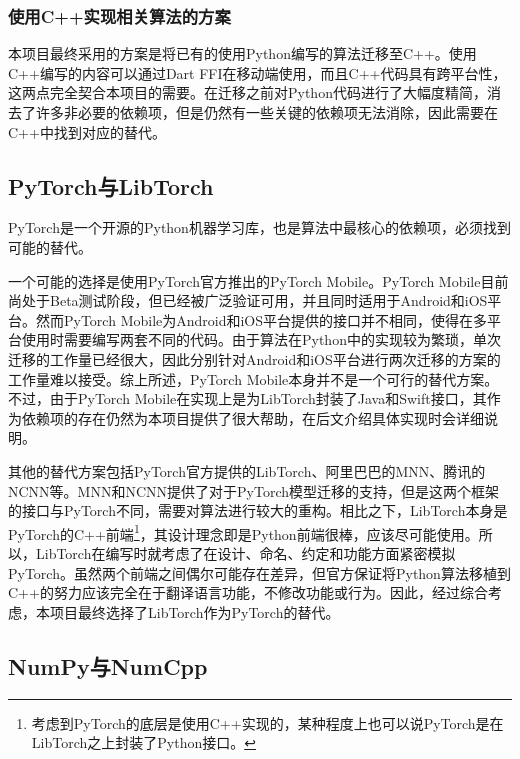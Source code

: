 \subsubsection{使用C++实现相关算法的方案}\label{subsubsec:python-cpp}

本项目最终采用的方案是将已有的使用Python编写的算法迁移至C++。使用C++编写的内容可以通过Dart FFI在移动端使用，而且C++代码具有跨平台性，这两点完全契合本项目的需要。在迁移之前对Python代码进行了大幅度精简，消去了许多非必要的依赖项，但是仍然有一些关键的依赖项无法消除，因此需要在C++中找到对应的替代。

\subsection{PyTorch与LibTorch}\label{subsec:pytorch-libtorch}

PyTorch\cite{paszkePyTorchImperativeStyle2019}是一个开源的Python机器学习库，也是算法中最核心的依赖项，必须找到可能的替代。

一个可能的选择是使用PyTorch官方推出的PyTorch Mobile。PyTorch Mobile目前尚处于Beta测试阶段，但已经被广泛验证可用，并且同时适用于Android和iOS平台。然而PyTorch Mobile为Android和iOS平台提供的接口并不相同，使得在多平台使用时需要编写两套不同的代码。由于算法在Python中的实现较为繁琐，单次迁移的工作量已经很大，因此分别针对Android和iOS平台进行两次迁移的方案的工作量难以接受。综上所述，PyTorch Mobile本身并不是一个可行的替代方案。不过，由于PyTorch Mobile在实现上是为LibTorch封装了Java和Swift接口，其作为依赖项的存在仍然为本项目提供了很大帮助，在后文介绍具体实现时会详细说明。

其他的替代方案包括PyTorch官方提供的LibTorch、阿里巴巴的MNN、腾讯的NCNN等。MNN和NCNN提供了对于PyTorch模型迁移的支持，但是这两个框架的接口与PyTorch不同，需要对算法进行较大的重构。相比之下，LibTorch本身是PyTorch的C++前端\footnote{考虑到PyTorch的底层是使用C++实现的，某种程度上也可以说PyTorch是在LibTorch之上封装了Python接口。}，其设计理念即是Python前端很棒，应该尽可能使用。所以，LibTorch在编写时就考虑了在设计、命名、约定和功能方面紧密模拟PyTorch。虽然两个前端之间偶尔可能存在差异，但官方保证将Python算法移植到C++的努力应该完全在于翻译语言功能，不修改功能或行为。因此，经过综合考虑，本项目最终选择了LibTorch作为PyTorch的替代。

\subsection{NumPy与NumCpp}\label{subsec:numpy-numcpp}


